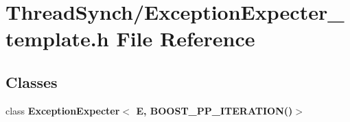 \section{Thread\-Synch/Exception\-Expecter\_\-template.h File Reference}
\label{_exception_expecter__template_8h}
\subsection*{Classes}
\begin{CompactItemize}
\item 
class {\bf Exception\-Expecter$<$ E, BOOST\_\-PP\_\-ITERATION()$>$}
\end{CompactItemize}
